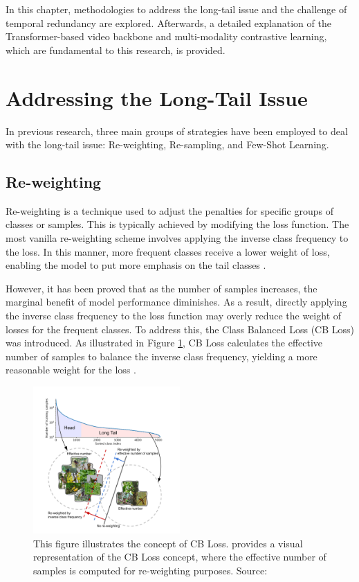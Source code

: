 In this chapter, methodologies to address the long-tail issue and the challenge of temporal redundancy are explored. Afterwards, a detailed explanation of the Transformer-based video backbone and multi-modality contrastive learning, which are fundamental to this research, is provided.

\section{Addressing the Long-Tail Issue}
In previous research, three main groups of strategies have been employed to deal with the long-tail issue: Re-weighting, Re-sampling, and Few-Shot Learning.

\subsection{Re-weighting}
Re-weighting is a technique used to adjust the penalties for specific groups of classes or samples. This is typically achieved by modifying the loss function. The most vanilla re-weighting scheme involves applying the inverse class frequency to the loss. In this manner, more frequent classes receive a lower weight of loss, enabling the model to put more emphasis on the tail classes \parencite{khan2017cost, mostajabi2015feedforward}.

However, it has been proved that as the number of samples increases, the marginal benefit of model performance diminishes. As a result, directly applying the inverse class frequency to the loss function may overly reduce the weight of losses for the frequent classes. To address this, the Class Balanced Loss (CB Loss) was introduced. As illustrated in Figure \ref{fig:concetpcbloss}, CB Loss calculates the effective number of samples to balance the inverse class frequency, yielding a more reasonable weight for the loss \parencite{cui2019class}.

\begin{figure}[ht]
    \centering
    \includegraphics[width=0.5\textwidth]{assets/charts_rw/CBLoss}
    \caption[Conceptual Illustration of CB Loss]{This figure illustrates the concept of CB Loss. provides a visual representation of the CB Loss concept, where the effective number of samples is computed for re-weighting purposes. Source: \parencite{cui2019class}}
    \label{fig:concetpcbloss}
\end{figure}


